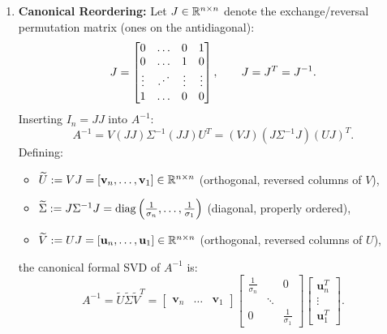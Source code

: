 \begin{example}
\begin{enumerate}
    \item \textbf{Canonical Reordering:}
    Let $J \in \mathbb{R}^{n \times n}$ denote the exchange/reversal permutation matrix (ones on the antidiagonal):
    \begin{equation}
        J = \begin{bmatrix}
            0 & \dots & 0 & 1 \\
            0 & \dots & 1 & 0 \\
            \vdots & \mathinner{\mkern1mu\raise1pt\vbox{\kern7pt\hbox{.}}\mkern2mu\raise4pt\hbox{.}\mkern2mu\raise7pt\hbox{.}\mkern1mu} & \vdots & \vdots \\
            1 & \dots & 0 & 0
        \end{bmatrix}, \qquad J = J^T = J^{-1}.
    \end{equation}
    Inserting $I_n = J J$ into $A^{-1}$:
    \begin{equation}
        A^{-1} = V (J J) \Sigma^{-1} (J J) U^T = (V J) (J \Sigma^{-1} J) (U J)^T.
    \end{equation}
    Defining:
    \begin{itemize}
        \item $\widetilde{U} := V J = [\mathbf{v}_n, \dots, \mathbf{v}_1] \in \mathbb{R}^{n \times n}$ (orthogonal, reversed columns of $V$),
            \item $\widetilde{\Sigma} := J \Sigma^{-1} J = \operatorname{diag}\left(\frac{1}{\sigma_n}, \dots, \frac{1}{\sigma_1}\right)$ (diagonal, properly ordered),
            \item $\widetilde{V} := U J = [\mathbf{u}_n, \dots, \mathbf{u}_1] \in \mathbb{R}^{n \times n}$ (orthogonal, reversed columns of $U$),
    \end{itemize}
    the canonical formal SVD of $A^{-1}$ is:
    \begin{equation}
        A^{-1} = \widetilde{U} \widetilde{\Sigma} \widetilde{V}^T = \begin{bmatrix} \mathbf{v}_n & \dots & \mathbf{v}_1 \end{bmatrix} \begin{bmatrix} \frac{1}{\sigma_n} & & 0 \\ & \ddots & \\ 0 & & \frac{1}{\sigma_1} \end{bmatrix} \begin{bmatrix} \mathbf{u}_n^T \\ \vdots \\ \mathbf{u}_1^T \end{bmatrix}.
    \end{equation}
\end{enumerate}
\end{example}


